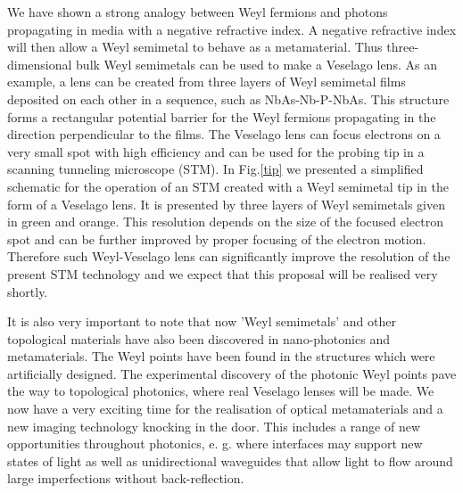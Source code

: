 \documentclass[prb,twocolumn,aps,superscriptaddress,showpacs,floatfix]{revtex4}
\begin{document}
	We have shown a strong analogy between Weyl fermions and photons propagating in media with a negative refractive index. A negative refractive index will then allow a Weyl semimetal to behave as a metamaterial. Thus three-dimensional bulk Weyl semimetals can be used to make a Veselago lens. As an example, a lens can be created from three layers of Weyl semimetal films deposited on each other in a sequence, such as NbAs-Nb-P-NbAs. This structure forms a rectangular potential barrier for the Weyl fermions propagating in the direction perpendicular to the films. The Veselago lens can focus electrons on a very small spot with high efficiency and can be used for the probing tip in a scanning tunneling microscope (STM).  In Fig.\ref{tip} we presented a simplified schematic for the operation of an STM created with a Weyl semimetal tip in the form of a Veselago lens. It is presented by three layers of Weyl semimetals given in green and orange. This resolution depends on the size of the focused electron spot and can be further improved by proper focusing of the electron motion. Therefore such Weyl-Veselago lens can significantly improve the resolution of the present STM technology and we expect that this proposal will be realised very shortly.

	It is also very important to note that now 'Weyl semimetals' and other topological materials have also been discovered in nano-photonics and metamaterials\cite{Ling-2013,Ling-2015}. The Weyl points have been found in the structures which were artificially designed. The experimental discovery of the photonic Weyl points pave the way to topological photonics, where real Veselago lenses will be made. We now have a very exciting time for the realisation of optical metamaterials and a new imaging technology knocking in the door. This includes a range of new opportunities throughout photonics, e. g. where interfaces may support new states of light as well as unidirectional waveguides that allow light to flow around large imperfections without back-reflection\cite{Tena-2015}.
\end{document}
